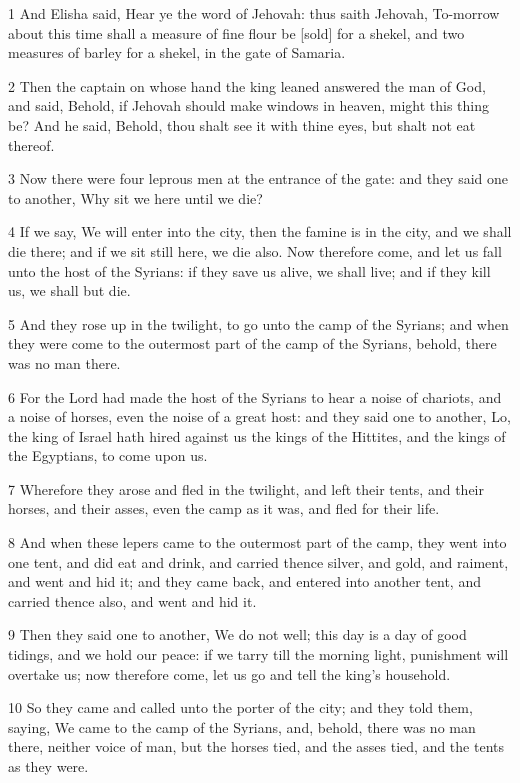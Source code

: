 \par 1 And Elisha said, Hear ye the word of Jehovah: thus saith Jehovah, To-morrow about this time shall a measure of fine flour be [sold] for a shekel, and two measures of barley for a shekel, in the gate of Samaria.
\par 2 Then the captain on whose hand the king leaned answered the man of God, and said, Behold, if Jehovah should make windows in heaven, might this thing be? And he said, Behold, thou shalt see it with thine eyes, but shalt not eat thereof.
\par 3 Now there were four leprous men at the entrance of the gate: and they said one to another, Why sit we here until we die?
\par 4 If we say, We will enter into the city, then the famine is in the city, and we shall die there; and if we sit still here, we die also. Now therefore come, and let us fall unto the host of the Syrians: if they save us alive, we shall live; and if they kill us, we shall but die.
\par 5 And they rose up in the twilight, to go unto the camp of the Syrians; and when they were come to the outermost part of the camp of the Syrians, behold, there was no man there.
\par 6 For the Lord had made the host of the Syrians to hear a noise of chariots, and a noise of horses, even the noise of a great host: and they said one to another, Lo, the king of Israel hath hired against us the kings of the Hittites, and the kings of the Egyptians, to come upon us.
\par 7 Wherefore they arose and fled in the twilight, and left their tents, and their horses, and their asses, even the camp as it was, and fled for their life.
\par 8 And when these lepers came to the outermost part of the camp, they went into one tent, and did eat and drink, and carried thence silver, and gold, and raiment, and went and hid it; and they came back, and entered into another tent, and carried thence also, and went and hid it.
\par 9 Then they said one to another, We do not well; this day is a day of good tidings, and we hold our peace: if we tarry till the morning light, punishment will overtake us; now therefore come, let us go and tell the king's household.
\par 10 So they came and called unto the porter of the city; and they told them, saying, We came to the camp of the Syrians, and, behold, there was no man there, neither voice of man, but the horses tied, and the asses tied, and the tents as they were.

